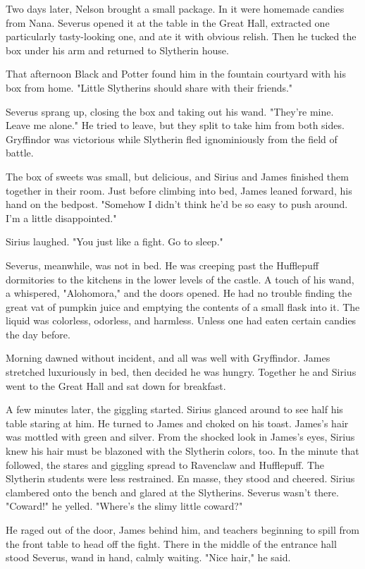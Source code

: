 Two days later, Nelson brought a small package. In it were homemade candies from Nana. Severus opened it at the table in the Great Hall, extracted one particularly tasty-looking one, and ate it with obvious relish. Then he tucked the box under his arm and returned to Slytherin house.

That afternoon Black and Potter found him in the fountain courtyard with his box from home. "Little Slytherins should share with their friends."

Severus sprang up, closing the box and taking out his wand. "They're mine. Leave me alone." He tried to leave, but they split to take him from both sides. Gryffindor was victorious while Slytherin fled ignominiously from the field of battle.

The box of sweets was small, but delicious, and Sirius and James finished them together in their room. Just before climbing into bed, James leaned forward, his hand on the bedpost. "Somehow I didn't think he'd be so easy to push around. I'm a little disappointed."

Sirius laughed. "You just like a fight. Go to sleep."

Severus, meanwhile, was not in bed. He was creeping past the Hufflepuff dormitories to the kitchens in the lower levels of the castle. A touch of his wand, a whispered, "Alohomora," and the doors opened. He had no trouble finding the great vat of pumpkin juice and emptying the contents of a small flask into it. The liquid was colorless, odorless, and harmless. Unless one had eaten certain candies the day before.

Morning dawned without incident, and all was well with Gryffindor. James stretched luxuriously in bed, then decided he was hungry. Together he and Sirius went to the Great Hall and sat down for breakfast.

A few minutes later, the giggling started. Sirius glanced around to see half his table staring at him. He turned to James and choked on his toast. James's hair was mottled with green and silver. From the shocked look in James's eyes, Sirius knew his hair must be blazoned with the Slytherin colors, too. In the minute that followed, the stares and giggling spread to Ravenclaw and Hufflepuff. The Slytherin students were less restrained. En masse, they stood and cheered. Sirius clambered onto the bench and glared at the Slytherins. Severus wasn't there. "Coward!" he yelled. "Where's the slimy little coward?"

He raged out of the door, James behind him, and teachers beginning to spill from the front table to head off the fight. There in the middle of the entrance hall stood Severus, wand in hand, calmly waiting. "Nice hair," he said.

